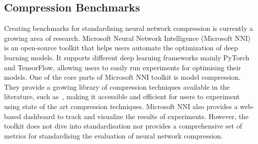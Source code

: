 








\subsection{Compression Benchmarks}
Creating benchmarks for standardising neural network compression is currently a growing area of research. %
%
Microsoft Neural Network Intelligence (Microsoft NNI)~\cite{nni2021} is an open-source toolkit that helps users automate the optimization of deep learning models. It supports different deep learning frameworks mainly PyTorch and TensorFlow, allowing users to easily run experiments for optimising their models. 
%
One of the core parts of Microsoft NNI toolkit is model compression. They provide a growing library of compression techniques available in the literature, such as~\cite{courbariaux2016binarized, esser2020learned, yang2022oneshot, frankle2019lottery}, making it accessible and efficient for users to experiment using state of the art compression techniques. Microsoft NNI also provides a web-based dashboard to track and visualize the results of experiments.
%
However, the toolkit does not dive into standardisation nor provides a comprehensive set of metrics for standardising the evaluation of neural network compression.


